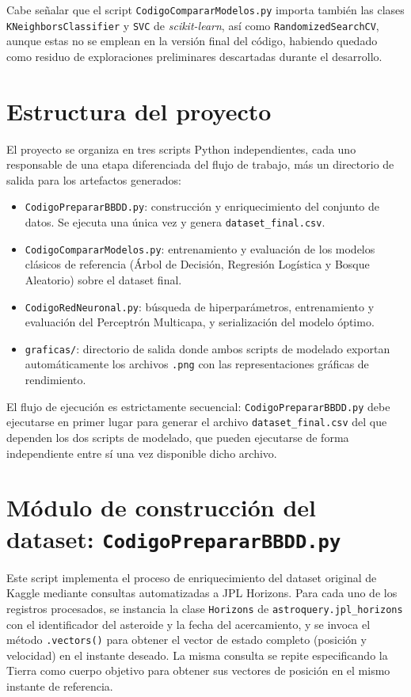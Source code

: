 \documentclass[12pt]{report} %
\begin{document}
Cabe señalar que el script \texttt{CodigoCompararModelos.py} importa también las clases \texttt{KNeighborsClassifier} y \texttt{SVC} de \textit{scikit-learn}, así como \texttt{RandomizedSearchCV}, aunque estas no se emplean en la versión final del código, habiendo quedado como residuo de exploraciones preliminares descartadas durante el desarrollo.
 
\section{Estructura del proyecto}
 
El proyecto se organiza en tres scripts Python independientes, cada uno responsable de una etapa diferenciada del flujo de trabajo, más un directorio de salida para los artefactos generados:
 
\begin{itemize}
    \item \texttt{CodigoPrepararBBDD.py}: construcción y enriquecimiento del conjunto de datos. Se ejecuta una única vez y genera \texttt{dataset\_final.csv}.
    \item \texttt{CodigoCompararModelos.py}: entrenamiento y evaluación de los modelos clásicos de referencia (Árbol de Decisión, Regresión Logística y Bosque Aleatorio) sobre el dataset final.
    \item \texttt{CodigoRedNeuronal.py}: búsqueda de hiperparámetros, entrenamiento y evaluación del Perceptrón Multicapa, y serialización del modelo óptimo.
    \item \texttt{graficas/}: directorio de salida donde ambos scripts de modelado exportan automáticamente los archivos \texttt{.png} con las representaciones gráficas de rendimiento.
\end{itemize}
 
El flujo de ejecución es estrictamente secuencial: \texttt{CodigoPrepararBBDD.py} debe ejecutarse en primer lugar para generar el archivo \texttt{dataset\_final.csv} del que dependen los dos scripts de modelado, que pueden ejecutarse de forma independiente entre sí una vez disponible dicho archivo.
 
\section{Módulo de construcción del dataset: \texttt{CodigoPrepararBBDD.py}}
 
Este script implementa el proceso de enriquecimiento del dataset original de Kaggle mediante consultas automatizadas a JPL Horizons. Para cada uno de los registros procesados, se instancia la clase \texttt{Horizons} de \texttt{astroquery.jpl\_horizons} con el identificador del asteroide y la fecha del acercamiento, y se invoca el método \texttt{.vectors()} para obtener el vector de estado completo (posición y velocidad) en el instante deseado. La misma consulta se repite especificando la Tierra como cuerpo objetivo para obtener sus vectores de posición en el mismo instante de referencia.
 
\end{document}
